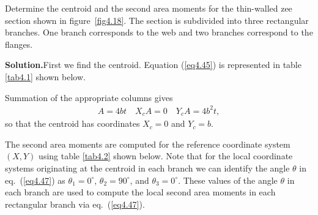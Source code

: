 \documentclass{AeroStructure-ERJohnson}
\begin{document}
\begin{example*}\label{ex4.3}\setcounter{equation}{0}\def\theequation{\alph{equation}}%
Determine the centroid and the second area moments for the thin-walled zee section shown in figure~\ref{fig4.18}. The section is subdivided into three rectangular branches. One branch corresponds to the web and two branches correspond to the flanges.\vspace*{-6pt}

{\def\thefigure{4.18}
}



\noindent\textbf{Solution.}\enspace First we find the centroid. Equation (\ref{eq4.45}) is represented in table \ref{tab4.1} shown below.

Summation of the appropriate columns gives
\begin{align}\label{ex4.3a}
A=4 b t \quad X_{c} A=0 \quad Y_{c} A=4 b^{2} t,
\end{align}
so that the centroid has coordinates $X_{c}=0$ and $Y_{c}=b$.

The second area moments are computed for the reference coordinate system $(X, Y)$ using table \ref{tab4.2} shown below. Note that for the local coordinate systems originating at the centroid in each branch we can identify the angle $\theta$ in eq.~(\ref{eq4.47}) as $\theta_{1}=0^{\circ}$, $\theta_{2}=90^{\circ}$, and $\theta_{3}=0^{\circ}$. These values of the angle $\theta$ in each branch are used to compute the local second area moments in each rectangular branch via eq.~(\ref{eq4.47}).



\end{example*}
\end{document}
